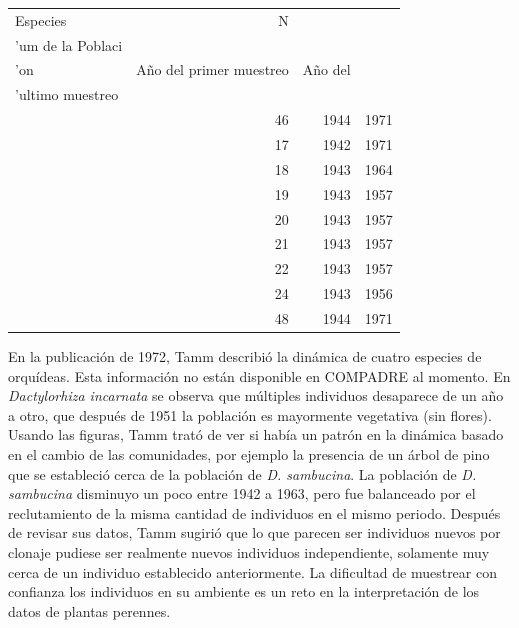 \documentclass[
  12pt,
  letterpaper,
]{book}
\begin{document}
\begin{table}
\fontsize{12.0pt}{14.0pt}\selectfont
\begin{tabular*}{\linewidth}{@{\extracolsep{\fill}}lrrr}
\toprule
Especies & N\\'um de la Poblaci\\'on & A\~no del primer muestreo & A\~no del \\'ultimo muestreo \\ 
\midrule\addlinespace[2.5pt]
{\itshape \cellcolor[HTML]{E0FFFF}{Dactylorhiza incarnata}} & 46 & 1944 & 1971 \\ 
{\itshape \cellcolor[HTML]{E0FFFF}{Dactylorhiza sambucina}} & 17 & 1942 & 1971 \\ 
{\itshape \cellcolor[HTML]{E0FFFF}{Dactylorhiza sambucina}} & 18 & 1943 & 1964 \\ 
{\itshape \cellcolor[HTML]{E0FFFF}{Dactylorhiza sambucina}} & 19 & 1943 & 1957 \\ 
{\itshape \cellcolor[HTML]{E0FFFF}{Dactylorhiza sambucina}} & 20 & 1943 & 1957 \\ 
{\itshape \cellcolor[HTML]{E0FFFF}{Dactylorhiza sambucina}} & 21 & 1943 & 1957 \\ 
{\itshape \cellcolor[HTML]{E0FFFF}{Dactylorhiza sambucina}} & 22 & 1943 & 1957 \\ 
{\itshape \cellcolor[HTML]{E0FFFF}{Orchis mascula}} & 24 & 1943 & 1956 \\ 
{\itshape \cellcolor[HTML]{E0FFFF}{Listera ovata}} & 48 & 1944 & 1971 \\ 
\bottomrule
\end{tabular*}
\end{table}

En la publicación de 1972, Tamm describió la dinámica de cuatro especies
de orquídeas. Esta información no están disponible en COMPADRE al
momento. En \emph{Dactylorhiza incarnata} se observa que múltiples
individuos desaparece de un año a otro, que después de 1951 la población
es mayormente vegetativa (sin flores). Usando las figuras, Tamm trató de
ver si había un patrón en la dinámica basado en el cambio de las
comunidades, por ejemplo la presencia de un árbol de pino que se
estableció cerca de la población de \emph{D. sambucina}. La población de
\emph{D. sambucina} disminuyo un poco entre 1942 a 1963, pero fue
balanceado por el reclutamiento de la misma cantidad de individuos en el
mismo periodo. Después de revisar sus datos, Tamm sugirió que lo que
parecen ser individuos nuevos por clonaje pudiese ser realmente nuevos
individuos independiente, solamente muy cerca de un individuo
establecido anteriormente. La dificultad de muestrear con confianza los
individuos en su ambiente es un reto en la interpretación de los datos
de plantas perennes.
\end{document}
